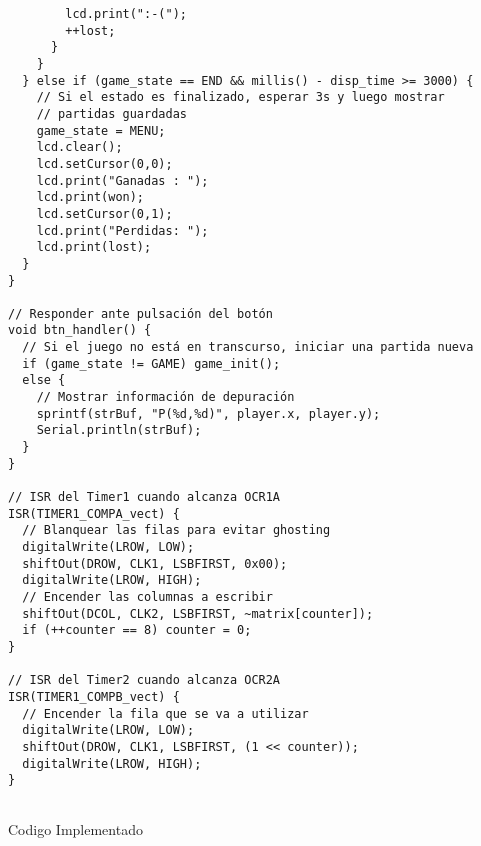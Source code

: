 \begin{listing}[H]
     \scriptsize
  \begin{verbatim}
        lcd.print(":-(");
        ++lost;
      }
    }
  } else if (game_state == END && millis() - disp_time >= 3000) {
    // Si el estado es finalizado, esperar 3s y luego mostrar
    // partidas guardadas
    game_state = MENU;
    lcd.clear();
    lcd.setCursor(0,0);
    lcd.print("Ganadas : ");
    lcd.print(won);
    lcd.setCursor(0,1);
    lcd.print("Perdidas: ");
    lcd.print(lost);
  }
}

// Responder ante pulsación del botón
void btn_handler() {
  // Si el juego no está en transcurso, iniciar una partida nueva
  if (game_state != GAME) game_init();
  else {
    // Mostrar información de depuración
    sprintf(strBuf, "P(%d,%d)", player.x, player.y);
    Serial.println(strBuf);
  }
}

// ISR del Timer1 cuando alcanza OCR1A
ISR(TIMER1_COMPA_vect) {
  // Blanquear las filas para evitar ghosting
  digitalWrite(LROW, LOW);
  shiftOut(DROW, CLK1, LSBFIRST, 0x00);
  digitalWrite(LROW, HIGH);
  // Encender las columnas a escribir
  shiftOut(DCOL, CLK2, LSBFIRST, ~matrix[counter]);
  if (++counter == 8) counter = 0;
}

// ISR del Timer2 cuando alcanza OCR2A
ISR(TIMER1_COMPB_vect) {
  // Encender la fila que se va a utilizar
  digitalWrite(LROW, LOW);
  shiftOut(DROW, CLK1, LSBFIRST, (1 << counter));
  digitalWrite(LROW, HIGH);
}


      \end{verbatim}
  \caption{Codigo Implementado}
  \label{lst:cod-1}
\end{listing}